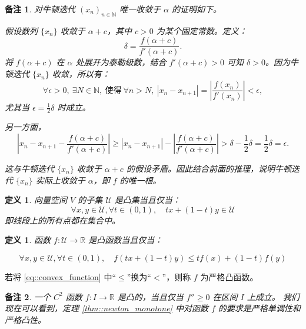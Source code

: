 \documentclass[a4paper]{ctexart}
\newtheorem{remark}{备注}
\newtheorem{definition}[theorem]{定义} %
\numberwithin{theorem}{section}
\numberwithin{equation}{section}
\numberwithin{figure}{section}
\numberwithin{remark}{section}
\begin{document}
\begin{remark}
对牛顿迭代 \( (x_n)_{n \in \mathbb{N}} \) 唯一收敛于 \(\alpha\) 的证明如下。

假设数列 \(\{x_n\}\) 收敛于 \(\alpha + c\)，其中 \(c > 0\) 为某个固定常数。定义：
\[
\delta = \frac{f(\alpha + c)}{f'(\alpha + c)}.
\]
将 \(f(\alpha + c)\) 在 \(\alpha\) 处展开为泰勒级数，结合 \(f'(\alpha + c) > 0\) 可知 \(\delta > 0\)。因为牛顿迭代 \(\{x_n\}\) 收敛，所以有：
\[
\forall \epsilon > 0,\ \exists N \in \mathbb{N},\ \text{使得} \ \forall n > N,\ |x_n - x_{n+1}| = \left| \frac{f(x_n)}{f'(x_n)} \right| < \epsilon,
\]
尤其当 \(\epsilon = \frac{1}{2} \delta\) 时成立。

另一方面，
\[
\left| x_n - x_{n+1} - \frac{f(\alpha + c)}{f'(\alpha + c)} \right|
\geq \left| x_n - x_{n+1} \right| - \left| \frac{f(\alpha + c)}{f'(\alpha + c)} \right|
> \delta - \frac{1}{2} \delta = \frac{1}{2} \delta = \epsilon.
\]

这与牛顿迭代 \(\{x_n\}\) 收敛于 \(\alpha + c\) 的假设矛盾。因此结合前面的推理，说明牛顿迭代 \(\{x_n\}\) 实际上收敛于 \(\alpha\)，即 \(f\) 的唯一根。
\end{remark}

\begin{definition}
向量空间 \(V\) 的子集 \(\mathcal{U}\) 是凸集当且仅当：
\begin{equation}
\forall x, y \in \mathcal{U}, \forall t \in (0,1), \quad tx + (1 - t)y \in \mathcal{U} 
\end{equation}
即线段上的所有点都在集合中。    
\end{definition}

\begin{definition}
函数 \(f : \mathcal{U} \to \mathbb{R}\) 是凸函数当且仅当：

\begin{equation}
    \label{eq::convex_function}
\forall x, y \in \mathcal{U}, \forall t \in (0,1), \quad f(tx + (1 - t)y) \le t f(x) + (1 - t) f(y) 
\end{equation}    
\end{definition}

若将 \ref{eq::convex_function} 中“\(\le\)”换为“\(<\)”，则称 \(f\) 为严格凸函数。


\begin{remark}
一个 \( C^2 \) 函数 \( f : I \to \mathbb{R} \) 是凸的，当且仅当 \( f'' \geq 0 \) 在区间 \( I \) 上成立。
我们现在可以看到，定理 \ref{thm::newton_monotone} 中对函数 \( f \) 的要求是严格单调性和严格凸性。
\end{remark}
\end{document}
